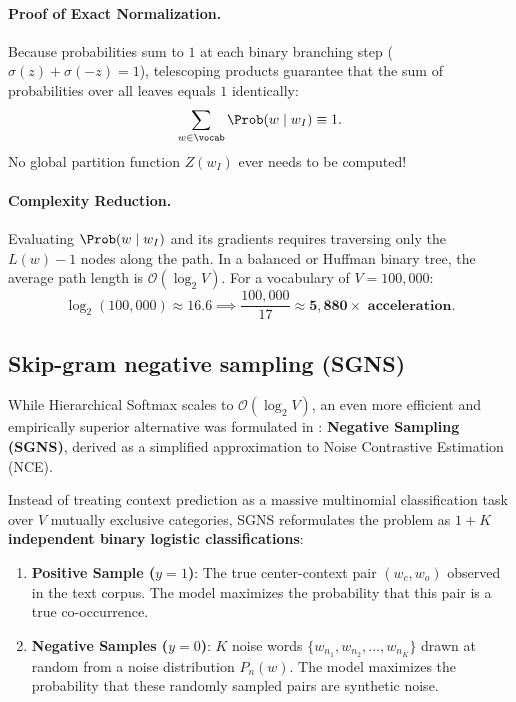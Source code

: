 \documentclass[../../main.tex]{subfiles}
\begin{document}
\paragraph{Proof of Exact Normalization.}
Because probabilities sum to $1$ at each binary branching step ($\sigma(z) + \sigma(-z) = 1$), telescoping products guarantee that the sum of probabilities over all leaves equals $1$ identically:
\begin{equation}
\label{eq:hierarchical_norm_proof}
\sum_{w \in \vocab} \Prob(w \mid w_I) \equiv 1.
\end{equation}
No global partition function $Z(w_I)$ ever needs to be computed!

\paragraph{Complexity Reduction.}
Evaluating $\Prob(w \mid w_I)$ and its gradients requires traversing only the $L(w) - 1$ nodes along the path. In a balanced or Huffman binary tree, the average path length is $\mathcal{O}(\log_2 V)$. For a vocabulary of $V = 100{,}000$:
\begin{equation}
\label{eq:hierarchical_speedup}
\log_2(100{,}000) \approx 16.6 \implies \frac{100{,}000}{17} \approx \mathbf{5{,}880\times \text{ acceleration}}.
\end{equation}

\subsection{Skip-gram negative sampling (SGNS)}
\label{subsec:sgns_formulation}

While Hierarchical Softmax scales to $\mathcal{O}(\log_2 V)$, an even more efficient and empirically superior alternative was formulated in \cite{mikolov2013distributed}: \textbf{Negative Sampling (SGNS)}, derived as a simplified approximation to Noise Contrastive Estimation (NCE).

Instead of treating context prediction as a massive multinomial classification task over $V$ mutually exclusive categories, SGNS reformulates the problem as \textbf{$1 + K$ independent binary logistic classifications}:
\begin{enumerate}
    \item \textbf{Positive Sample ($y = 1$)}: The true center-context pair $(w_c, w_o)$ observed in the text corpus. The model maximizes the probability that this pair is a true co-occurrence.
    \item \textbf{Negative Samples ($y = 0$)}: $K$ noise words $\{w_{n_1}, w_{n_2}, \dots, w_{n_K}\}$ drawn at random from a noise distribution $P_n(w)$. The model maximizes the probability that these randomly sampled pairs are synthetic noise.
\end{enumerate}
\end{document}
